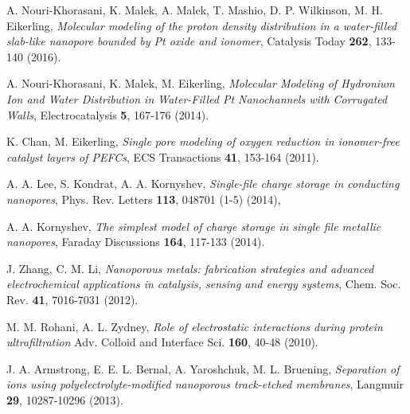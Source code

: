 \documentclass[3p,english,preprint]{elsarticle}
\begin{document}
 \begin{thebibliography}{00}





A. Nouri-Khorasani, K. Malek, A. Malek, T. Mashio,  D. P. Wilkinson, 
M. H. Eikerling,  
{\it Molecular modeling of the proton density distribution in a 
water-filled slab-like nanopore bounded by Pt oxide and ionomer}, 
Catalysis Today {\bf  262},  133-140 (2016).


A. Nouri-Khorasani, K. Malek, M. Eikerling,  
{\it Molecular Modeling of Hydronium Ion and Water Distribution 
in Water-Filled Pt Nanochannels with Corrugated Walls}, 
 Electrocatalysis {\bf 5}, 167-176 (2014).


K. Chan, M. Eikerling,
{\it Single pore modeling of oxygen reduction in ionomer-free catalyst layers of PEFCs},
ECS Transactions {\bf 41}, 153-164 (2011).


A. A. Lee, S.  Kondrat, A. A.  Kornyshev,  
{\it Single-file charge storage in conducting nanopores}, 
 Phys. Rev. Letters {\bf 113},  048701 (1-5) (2014),

A. A. Kornyshev, 
{\it The simplest model of charge storage in single file metallic nanopores}, 
 Faraday Discussions {\bf 164}, 117-133 (2014).

J. Zhang, C. M. Li, 
{\it Nanoporous metals: fabrication strategies and advanced electrochemical applications in catalysis, sensing and energy systems},
Chem. Soc. Rev. {\bf 41}, 7016-7031 (2012).



 M. M. Rohani, A. L.  Zydney,
{\it Role of electrostatic interactions during protein ultrafiltration}
 Adv. Colloid and Interface Sci. {\bf 160}, 40-48 (2010).


 J. A. Armstrong,  E. E. L. Bernal, A.  Yaroshchuk,  M. L.  Bruening,  
{\it Separation of ions using polyelectrolyte-modified nanoporous track-etched membranes},
 Langmuir {\bf 29},  10287-10296  (2013). 



\end{thebibliography}
\end{document}
